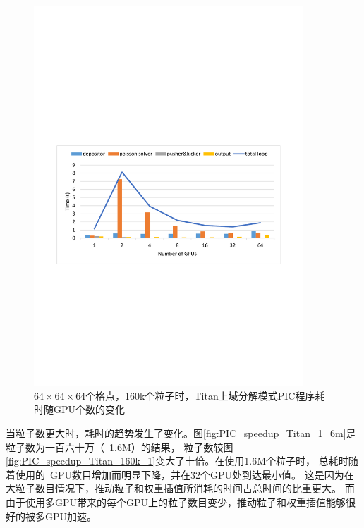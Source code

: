 \begin{figure}[!htb]
  \centering
  \includegraphics[width=0.9\textwidth]{Img/PIC_speedup_Titan_160k_2.pdf}
  \caption{$64 \times 64 \times 64$个格点，160k个粒子时，Titan上域分解模式PIC程序耗时随GPU个数的变化}
  \label{fig:PIC_speedup_Titan_160k_2}
\end{figure}

当粒子数更大时，耗时的趋势发生了变化。图\eqref{fig:PIC_speedup_Titan_1_6m}是粒子数为一百六十万（~1.6M）的结果，
粒子数较图\eqref{fig:PIC_speedup_Titan_160k_1}变大了十倍。在使用1.6M个粒子时，
总耗时随着使用的~GPU数目增加而明显下降，并在32个GPU处到达最小值。
这是因为在大粒子数目情况下，推动粒子和权重插值所消耗的时间占总时间的比重更大。
而由于使用多GPU带来的每个GPU上的粒子数目变少，推动粒子和权重插值能够很好的被多GPU加速。

